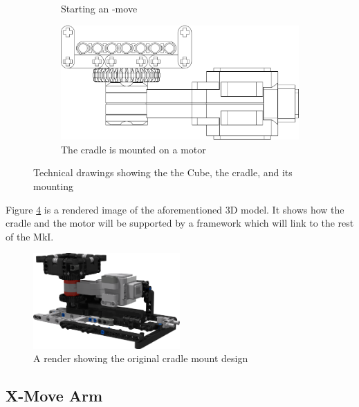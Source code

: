 \documentclass{report}
\newcommand{\move}[1]{\uppercase{\texttt{\formatmovesnospace{#1}}}-move}
\begin{document}
\begin{figure}[H]
\begin{subfigure}[b]{0.2\textwidth}
    		\caption{Starting an \move{x}}
    		\label{fig:dwgCradleCurvedEdgeTilted}
    	\end{subfigure}
	    \hspace{10mm}
	    \begin{subfigure}[b]{0.4\textwidth}
	    	\includegraphics[width=\textwidth]{Resources/Images/dwgCradleProfileV1.png}
	    	\caption{The cradle is mounted on a motor}
	    	\label{fig:dwgCradleProfileV1}
	    \end{subfigure}
    	\caption{Technical drawings showing the the Cube, the cradle, and its mounting}
    	\label{fig:CradleDrawings}
    \end{figure}    
    
    Figure \ref{fig:rdrCradleMountedRotor} is a rendered image of the aforementioned 3D model. It shows how the cradle and the motor will be supported by a framework which will link to the rest of the MkI.
    
    \begin{figure}[H]
    	\centering
   		\includegraphics[width=0.5\textwidth]{Resources/Images/rdrCradleMountedRotor.png}
   		\caption{A render showing the original cradle mount design}
   		\label{fig:rdrCradleMountedRotor}
    \end{figure}
    
    \subsection{X-Move Arm}
    
\end{document}
